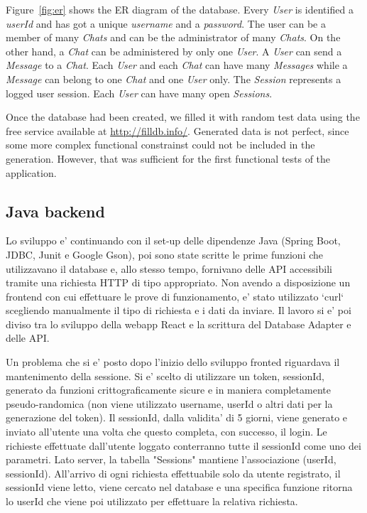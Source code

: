 \documentclass[10pt]{article}
\begin{document}
Figure~\ref{fig:er} shows the ER diagram of the database. Every \emph{User} 
is identified a \emph{userId} and has got a unique \emph{username} and a 
\emph{password}. The user can be a member of many \emph{Chats} and can 
be the administrator of many \emph{Chats}. On the other hand, a \emph{Chat} 
can be administered by only one \emph{User}. A \emph{User} can send a 
\emph{Message} to a \emph{Chat}. Each \emph{User} and each \emph{Chat} can 
have many \emph{Messages} while a \emph{Message} can belong to one \emph{Chat}
and one \emph{User} only. The \emph{Session} represents a logged user session.
Each \emph{User} can have many open \emph{Sessions}.

Once the database had been created, we filled it with random test data using the free
service available at \url{http://filldb.info/}. Generated data is not perfect, 
since some more complex functional constrainst could not be included in the 
generation. However, that was sufficient for the first functional tests of the
application.

\subsection{Java backend}
Lo sviluppo e' continuando con il set-up delle dipendenze Java (Spring Boot, JDBC, Junit e Google Gson), poi sono state scritte le prime funzioni che utilizzavano il database e, allo stesso tempo, fornivano delle API accessibili tramite una richiesta HTTP di tipo appropriato. Non avendo a disposizione un frontend con cui effettuare le prove di funzionamento, e' stato utilizzato `curl` scegliendo manualmente il tipo di richiesta e i dati da inviare.
Il lavoro si e' poi diviso tra lo sviluppo della webapp React e la scrittura del Database Adapter e delle API.

Un problema che si e' posto dopo l'inizio dello sviluppo fronted riguardava il mantenimento della sessione. Si e' scelto di utilizzare un token, sessionId, generato da funzioni crittograficamente sicure e in maniera completamente pseudo-randomica (non viene utilizzato username, userId o altri dati per la generazione del token). Il sessionId, dalla validita' di 5 giorni, viene generato e inviato all'utente una volta che questo completa, con successo, il login. Le richieste effettuate dall'utente loggato conterranno tutte il sessionId come uno dei parametri. Lato server, la tabella "Sessions" mantiene l'associazione (userId, sessionId). All'arrivo di ogni richiesta effettuabile solo da utente registrato, il sessionId viene letto, viene cercato nel database e una specifica funzione ritorna lo userId che viene poi utilizzato per effettuare la relativa richiesta.
\end{document}
